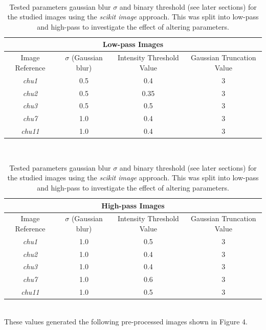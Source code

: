 \documentclass{article}
\begin{document}
	\\
	\begin{table}[ht]
	\begin{center}
	\begin{tabular}{ |c|c|c|c| } 
		\hline
		\multicolumn{4}{|c|}{Low-pass Images} \\
		\hline
		Image Reference & $\sigma$ (Gaussian blur) & Intensity Threshold Value & Gaussian Truncation Value \\
		\hline
		\textit{chu1} & 0.5 & 0.4 & 3 \\ 
		\textit{chu2} & 0.5 & 0.35 & 3 \\ 
		\textit{chu3} & 0.5 & 0.5 & 3 \\ 
		\textit{chu7} & 1.0 & 0.4 & 3 \\ 
		\textit{chu11} & 1.0 & 0.4 & 3 \\ 
		\hline
	\end{tabular}
	\\
	\begin{tabular}{ |c|c|c|c| } 
		\hline
		\multicolumn{4}{|c|}{High-pass Images} \\
		\hline
		Image Reference & $\sigma$ (Gaussian blur) & Intensity Threshold Value & Gaussian Truncation Value \\
		\hline
		\textit{chu1} & 1.0 & 0.5 & 3 \\ 
		\textit{chu2} & 1.0 & 0.4 & 3 \\ 
		\textit{chu3} & 1.0 & 0.4 & 3 \\ 
		\textit{chu7} & 1.0 & 0.6 & 3 \\ 
		\textit{chu11} & 1.0 & 0.5 & 3 \\ 
		\hline
	\end{tabular}
	\caption{Tested parameters gaussian blur $\sigma$ and binary threshold (see later sections) for the studied images using the \textit{scikit image} approach. This was split into low-pass and high-pass to investigate the effect of altering parameters.}
	\label{tab:imageprocessing}
	\end{center}
	\end{table}
	\\
These values generated the following pre-processed images shown in Figure 4.
\end{document}
